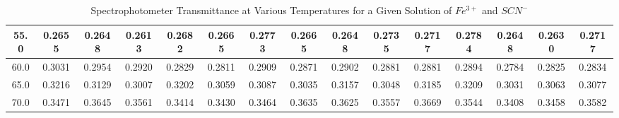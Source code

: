 \begin{table}[H]
{\begin{tabular}{|c|cccccccccccccc|}
55.0                                         & \multicolumn{1}{c|}{0.2655}            & \multicolumn{1}{c|}{0.2648}            & \multicolumn{1}{c|}{0.2613}            & \multicolumn{1}{c|}{0.2682}            & \multicolumn{1}{c|}{0.2665}            & \multicolumn{1}{c|}{0.2773}            & \multicolumn{1}{c|}{0.2665}            & \multicolumn{1}{c|}{0.2648}            & \multicolumn{1}{c|}{0.2735}            & \multicolumn{1}{c|}{0.2717}             & \multicolumn{1}{c|}{0.2784}             & \multicolumn{1}{c|}{0.2648}             & \multicolumn{1}{c|}{0.2630}              & 0.2717             \\ \hline
60.0                                         & \multicolumn{1}{c|}{0.3031}            & \multicolumn{1}{c|}{0.2954}            & \multicolumn{1}{c|}{0.2920}             & \multicolumn{1}{c|}{0.2829}            & \multicolumn{1}{c|}{0.2811}            & \multicolumn{1}{c|}{0.2909}            & \multicolumn{1}{c|}{0.2871}            & \multicolumn{1}{c|}{0.2902}            & \multicolumn{1}{c|}{0.2881}            & \multicolumn{1}{c|}{0.2881}             & \multicolumn{1}{c|}{0.2894}             & \multicolumn{1}{c|}{0.2784}             & \multicolumn{1}{c|}{0.2825}             & 0.2834             \\ \hline
65.0                                         & \multicolumn{1}{c|}{0.3216}            & \multicolumn{1}{c|}{0.3129}            & \multicolumn{1}{c|}{0.3007}            & \multicolumn{1}{c|}{0.3202}            & \multicolumn{1}{c|}{0.3059}            & \multicolumn{1}{c|}{0.3087}            & \multicolumn{1}{c|}{0.3035}            & \multicolumn{1}{c|}{0.3157}            & \multicolumn{1}{c|}{0.3048}            & \multicolumn{1}{c|}{0.3185}             & \multicolumn{1}{c|}{0.3209}             & \multicolumn{1}{c|}{0.3031}             & \multicolumn{1}{c|}{0.3063}             & 0.3077             \\ \hline
70.0                                         & \multicolumn{1}{c|}{0.3471}            & \multicolumn{1}{c|}{0.3645}            & \multicolumn{1}{c|}{0.3561}            & \multicolumn{1}{c|}{0.3414}            & \multicolumn{1}{c|}{0.3430}             & \multicolumn{1}{c|}{0.3464}            & \multicolumn{1}{c|}{0.3635}            & \multicolumn{1}{c|}{0.3625}            & \multicolumn{1}{c|}{0.3557}            & \multicolumn{1}{c|}{0.3669}             & \multicolumn{1}{c|}{0.3544}             & \multicolumn{1}{c|}{0.3408}             & \multicolumn{1}{c|}{0.3458}             & 0.3582             \\ \hline
\end{tabular}}
\caption{Spectrophotometer Transmittance at Various Temperatures for a Given Solution of \(Fe^{3+}\) and \(SCN^-\)}
\label{table:transmittance_temperature_data}
\end{table}

